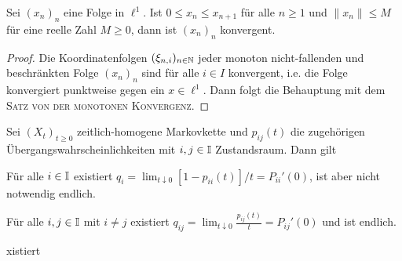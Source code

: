 \documentclass[a4paper]{paper}
\numberwithin{equation}{satz}
\begin{document}
\begin{prop}
Sei $(x_n)_n$ eine Folge in $\ell^1$. Ist $0\leq x_n\leq x_{n+1}$ für alle $n\geq 1$ und $\|x_n\|\leq M$ für eine reelle Zahl $M\geq0$, dann ist $(x_n)_n$ konvergent. 
\end{prop}

\begin{proof}
Die Koordinatenfolgen $(\xi_{n,i})_{n\in\mathbb{N}}$ jeder monoton nicht-fallenden und beschränkten Folge $(x_n)_n$ sind für alle $i\in I$ konvergent, i.e. die Folge konvergiert punktweise gegen ein $x\in \ell^1$. Dann folgt die Behauptung mit dem \textsc{Satz von der monotonen Konvergenz}.
\end{proof}



\begin{prop}
Sei $(X_t)_{t\geq0}$ zeitlich-homogene Markovkette und $p_{ij}(t)$ die zugehörigen Übergangswahrscheinlichkeiten mit $i,j\in\mathbb{I}$ Zustandsraum. Dann gilt
\begin{compactenum}
\item  Für alle $i\in\mathbb{I}$ existiert $q_i=\lim_{t\downarrow 0}[1-p_{ii}(t)]/t=P_{ii}'(0)$, ist aber nicht notwendig endlich.
\item Für alle $i,j\in\mathbb{I}$ mit $i\neq j$ existiert $q_{ij}=\lim_{t\downarrow 0}\frac{p_{ij}(t)}{t}=P_{ij}'(0)$ und ist endlich.
\end{compactenum}
xistiert
\end{prop}
\end{document}
